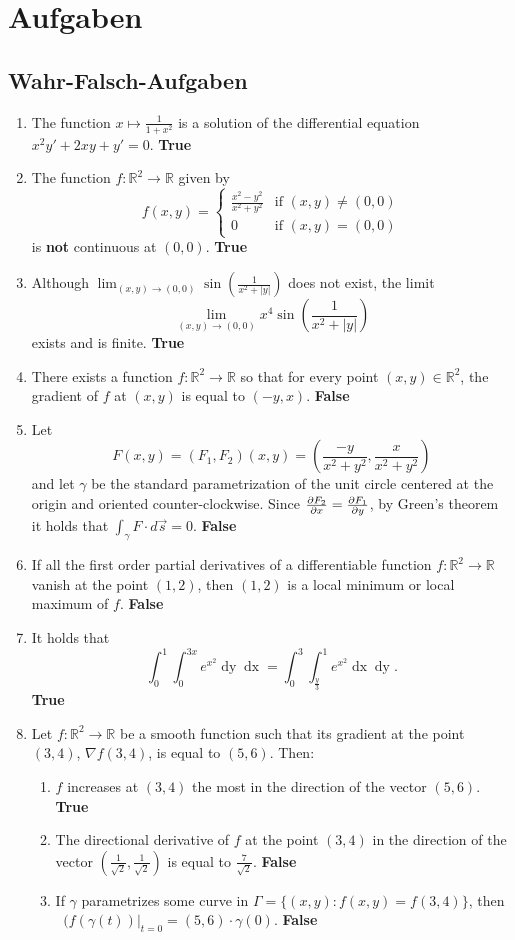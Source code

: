 \documentclass[a4paper,10pt]{article}
\def\R{\mathbb{R}}
\begin{document}
\endgroup
\section{Aufgaben}
\subsection{Wahr-Falsch-Aufgaben}
\begin{enumerate}
    \item The function $x \mapsto \frac{1}{1 + x^2}$ is a solution of the differential equation $x^2y' + 2xy + y' = 0$. \textbf{True}
    \item The function $f: \R^2 \rightarrow \R$ given by
    \[f(x,y) = 
    \begin{cases}
        \frac{x^2 - y^2}{x^2 + y^2} &\text{if } (x, y) \neq (0, 0)\\
        0 &\text{if } (x, y) = (0, 0)
    \end{cases}
    \]
    is \textbf{not} continuous at $(0, 0)$. \textbf{True}
    \item Although $\lim_{(x, y) \to (0, 0)} \sin \left(\frac{1}{x^2 + |y|}\right)$ does not exist, the limit
    \[\lim_{(x, y) \to (0, 0)} x^4 \sin \left(\frac{1}{x^2 + |y|}\right)\]
    exists and is finite. \textbf{True}
    \item There exists a function $f: \R^2 \to \R$ so that for every point $(x, y) \in \R^2$, the gradient of $f$ at $(x, y)$ is equal to $(-y, x)$. \textbf{False}
    \item Let
    \[F(x, y) = (F_1, F_2)(x, y) = \left(\frac{-y}{x^2 + y^2}, \frac{x}{x^2 + y^2}\right)\]
    and let $\gamma$ be the standard parametrization of the unit circle centered at the origin and oriented counter-clockwise. Since $\pdv{F_2}{x} = \pdv{F_1}{y}$, by Green's theorem it holds that $\int_\gamma F \cdot d \Vec{s} = 0$. \textbf{False}
    \item If all the first order partial derivatives of a differentiable function $f: \R^2 \to \R$ vanish at the point $(1, 2)$, then $(1, 2)$ is a local minimum or local maximum of $f$. \textbf{False}
    \item It holds that
    \[\int_0^1 \int_0^{3x} e^{x^2} \mathop{dy} \mathop{dx} = \int_0^3 \int_{\frac{y}{3}}^1 e^{x^2} \mathop{dx} \mathop{dy} \text{.}\]
    \textbf{True}
    \item Let $f: \R^2 \to \R$ be a smooth function such that its gradient at the point $(3, 4)$, $\nabla f(3, 4)$, is equal to $(5, 6)$. Then:
    \begin{enumerate}
        \item $f$ increases at $(3, 4)$ the most in the direction of the vector $(5, 6)$. \textbf{True}
        \item The directional derivative of $f$ at the point $(3, 4)$ in the direction of the vector $\left(\frac{1}{\sqrt{2}}, \frac{1}{\sqrt{2}}\right)$ is equal to $\frac{7}{\sqrt{2}}$. \textbf{False}
        \item If $\gamma$ parametrizes some curve in $\Gamma = \{(x, y): f(x, y) = f(3, 4)\}$, then $\left.\mathop{\frac{d}{dt}} (f(\gamma(t))\right|_{t = 0} = (5, 6) \cdot \gamma(0)$. \textbf{False}
    \end{enumerate}
\end{enumerate}
\end{document}
